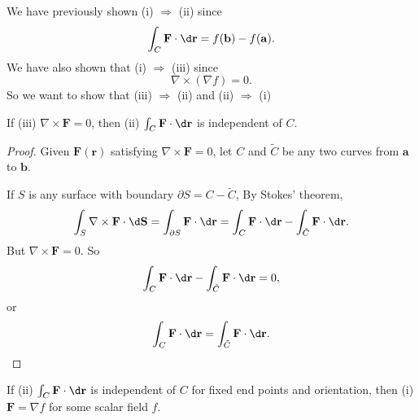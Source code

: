 \documentclass[a4paper]{article}
\begin{document}
We have previously shown (i) $\Rightarrow$ (ii) since
\[
  \int_C \mathbf{F}\cdot \d \mathbf{r} = f(\mathbf{b}) - f(\mathbf{a}).
\]
We have also shown that (i) $\Rightarrow$ (iii) since
\[
  \nabla \times (\nabla f) = 0.
\]
So we want to show that (iii) $\Rightarrow $ (ii) and (ii) $\Rightarrow $ (i)
\begin{prop}
  If (iii) $\nabla\times \mathbf{F}= 0 $, then (ii) $\int_C \mathbf{F}\cdot \d \mathbf{r}$ is independent of $C$.
\end{prop}

\begin{proof}
  Given $\mathbf{F}(\mathbf{r})$ satisfying $\nabla\times \mathbf{F} = 0$, let $C$ and $\tilde C$ be any two curves from $\mathbf{a}$ to $\mathbf{b}$.
  \begin{center}
  \end{center}
  If $S$ is any surface with boundary $\partial S = C - \tilde C$, By Stokes' theorem,
  \[
    \int_{S}\nabla \times \mathbf{F}\cdot \d \mathbf{S} = \int_{\partial S}\mathbf{F}\cdot \d \mathbf{r} = \int_C \mathbf{F}\cdot \d \mathbf{r} - \int_{\tilde{C}}\mathbf{F}\cdot \d \mathbf{r}.
  \]
  But $\nabla\times \mathbf{F} = 0$. So
  \[
    \int_C \mathbf{F}\cdot \d \mathbf{r} - \int_{\tilde{C}} \mathbf{F}\cdot \d \mathbf{r} = 0,
  \]
  or
  \[
    \int_C \mathbf{F}\cdot \d \mathbf{r} = \int_{\tilde{C}}\mathbf{F}\cdot \d \mathbf{r}.
  \]
\end{proof}

\begin{prop}
  If (ii) $\int_C \mathbf{F}\cdot \d \mathbf{r}$ is independent of $C$ for fixed end points and orientation, then (i) $\mathbf{F} = \nabla f$ for some scalar field $f$.
\end{prop}
\end{document}
